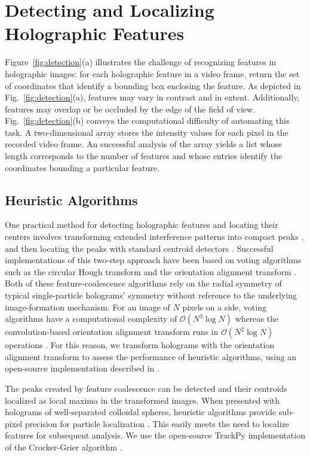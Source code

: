 \section{Detecting and Localizing Holographic Features}

Figure~\ref{fig:detection}(a) illustrates the challenge of
recognizing features in holographic images: for each
holographic feature in a video frame, return the set of coordinates
that identify a bounding box enclosing the feature. As depicted
in Fig.~\ref{fig:detection}(a), features may vary in
contrast and in extent. Additionally, features may overlap or be occluded by
the edge of the field of view. Fig.~\ref{fig:detection}(b) conveys the computational
difficulty of automating this task. A two-dimensional array stores the intensity values
for each pixel in the recorded video frame. An successful analysis of the
array yields a list whose length corresponds to the number of features and whose
entries identify the coordinates bounding a particular feature.
  
\subsection{ Heuristic Algorithms}
\label{sec:heuristic}

One practical method for detecting holographic features and 
locating their centers involves transforming extended interference
patterns into compact peaks \cite{cheong09,krishnatreya14a}, and 
then locating the peaks with standard centroid detectors 
\cite{crocker96,allan16trackpy}. 
Successful implementations of this two-step
approach have been based on
voting algorithms such as the circular Hough transform
\cite{cheong09,parthasarathy12,allan16trackpy} and
the orientation alignment transform \cite{krishnatreya14a}.
Both of these feature-coalescence algorithms rely on the
radial symmetry of typical single-particle holograms'
symmetry without reference to the underlying image-formation
mechanism.
For an image of $N$ pixels on a side, voting algorithms
have a computational complexity of $\mathcal{O}\left (N^3 \log N \right )$ 
\cite{hollitt13} whereas the convolution-based orientation alignment
transform
runs in $\mathcal{O}\left ( N^2 \log N \right )$ operations \cite{cheong09}.
For this reason, we transform holograms with the
orientation alignment transform
to assess the performance of heuristic algorithms,
using an open-source implementation described
in \cite{cheong09}.

The peaks created by feature coalescence can be detected
and their centroids localized as local maxima in the transformed images.
When presented with holograms of well-separated
colloidal spheres, heuristic algorithms provide
sub-pixel precision for particle localization
\cite{cheong09,krishnatreya14a}.
This easily meets the need to localize
features for subsequent analysis.
We use the open-source
TrackPy implementation \cite{allan16trackpy}
of the Crocker-Grier algorithm \cite{crocker96}.

